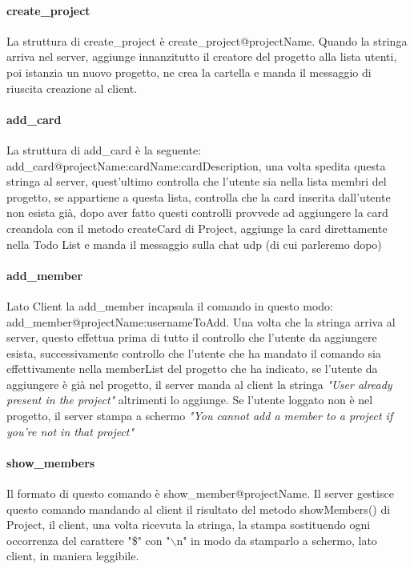 \documentclass[]{article}
\begin{document}
\paragraph{create\_project}
La struttura di create\_project è create\_project@projectName. Quando la stringa arriva nel server, aggiunge innanzitutto il creatore del progetto alla lista utenti, poi istanzia un nuovo progetto, ne crea la cartella e manda il messaggio di riuscita creazione al client.
\paragraph{add\_card}
La struttura di add\_card è la seguente:\\
add\_card@projectName:cardName:cardDescription, una volta spedita questa stringa al server, quest'ultimo controlla che l'utente sia nella lista membri del progetto, se appartiene a questa lista, controlla che la card inserita dall'utente non esista già, dopo aver fatto questi controlli provvede ad aggiungere la card creandola con il metodo createCard di Project, aggiunge la card direttamente nella Todo List e manda il messaggio sulla chat udp (di cui parleremo dopo)
\paragraph{add\_member}
Lato Client la add\_member incapsula il comando in questo modo:\\ add\_member@projectName:usernameToAdd. Una volta che la stringa arriva al server, questo effettua prima di tutto il controllo che l'utente da aggiungere esista, successivamente controllo che l'utente che ha mandato il comando sia effettivamente nella memberList del progetto che ha indicato, se l'utente da aggiungere è già nel progetto, il server manda al client la stringa \textit{"User already present in the project"} altrimenti lo aggiunge.
Se l'utente loggato non è nel progetto, il server stampa a schermo \textit{"You cannot add a member to a project if you're not in that project"}
\paragraph{show\_members}
Il formato di questo comando è show\_member@projectName. Il server gestisce questo comando mandando al client il risultato del metodo showMembers() di Project, il client, una volta ricevuta la stringa, la stampa sostituendo ogni occorrenza del carattere "\$" con "$\backslash$n" in modo da stamparlo a schermo, lato client, in maniera leggibile.
\end{document}
